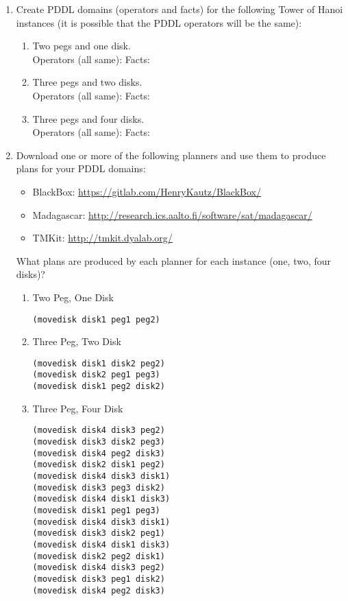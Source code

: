 \documentclass[12pt,letterpaper]{ntdhw}
\begin{document}
\begin{enumerate}
  \item  Create PDDL domains (operators and facts) for the following Tower of
  Hanoi instances (it is possible that the PDDL operators will be the
  same):
  \begin{enumerate}
    \item Two pegs and one disk. \\
    Operators (all same):
    Facts:
    \item Three pegs and two disks. \\
    Operators (all same):
    Facts:
    \item Three pegs and four disks. \\
    Operators (all same):
    Facts:
  \end{enumerate}

  \item  Download one or more of the following planners and use them to
  produce plans for your PDDL domains:
  \begin{itemize}
    \item BlackBox:
    \url{https://gitlab.com/HenryKautz/BlackBox/}
    \item Madagascar:
    \url{http://research.ics.aalto.fi/software/sat/madagascar/}
    \item TMKit:
    \url{http://tmkit.dyalab.org/}
  \end{itemize}
  What plans are produced by each planner for each instance (one, two,
  four disks)?

    \begin{enumerate}
        \item Two Peg, One Disk \\
        \begin{lstlisting}[language=pddl, style=pddlstyle,
  basicstyle=\scriptsize]
(movedisk disk1 peg1 peg2)
        \end{lstlisting}
        \item Three Peg, Two Disk
        \begin{lstlisting}[language=pddl, style=pddlstyle,
  basicstyle=\scriptsize]
(movedisk disk1 disk2 peg2)
(movedisk disk2 peg1 peg3)
(movedisk disk1 peg2 disk2)
        \end{lstlisting}
        \item Three Peg, Four Disk
        \begin{lstlisting}[language=pddl, style=pddlstyle,
  basicstyle=\scriptsize]
(movedisk disk4 disk3 peg2)
(movedisk disk3 disk2 peg3)
(movedisk disk4 peg2 disk3)
(movedisk disk2 disk1 peg2)
(movedisk disk4 disk3 disk1)
(movedisk disk3 peg3 disk2)
(movedisk disk4 disk1 disk3)
(movedisk disk1 peg1 peg3)
(movedisk disk4 disk3 disk1)
(movedisk disk3 disk2 peg1)
(movedisk disk4 disk1 disk3)
(movedisk disk2 peg2 disk1)
(movedisk disk4 disk3 peg2)
(movedisk disk3 peg1 disk2)
(movedisk disk4 peg2 disk3)
  \end{lstlisting}
    \end{enumerate}


\end{enumerate}
\end{document}
